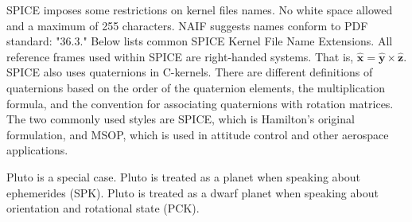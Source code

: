 \documentclass[crop=false,class=book]{standalone}
\begin{document}
SPICE imposes some restrictions on kernel files names. No white space allowed and a maximum of 255 characters. NAIF suggests names conform to PDF standard: "36.3." Below lists common SPICE Kernel File Name Extensions. All reference frames used within SPICE are right-handed systems. That is, $\hat{\mathbf{x}} = \hat{\mathbf{y}}\times \hat{\mathbf{z}}$. SPICE also uses quaternions in C-kernels. There are different definitions of quaternions based on the order of the quaternion elements, the multiplication formula, and the convention for associating quaternions with rotation matrices. The two commonly used styles are SPICE, which is Hamilton's original formulation, and MSOP, which is used in attitude control and other aerospace applications.
\begin{table}[H]
    \centering
    \caption{List of Kernel File Types}
    \label{tab:naif_list_of_kernel_file_types}
\end{table}
\begin{remark}
Pluto is a special case. Pluto is treated as a planet when speaking about ephemerides (SPK). Pluto is treated as a dwarf planet when speaking about orientation and rotational state (PCK).
\end{remark}
\end{document}
